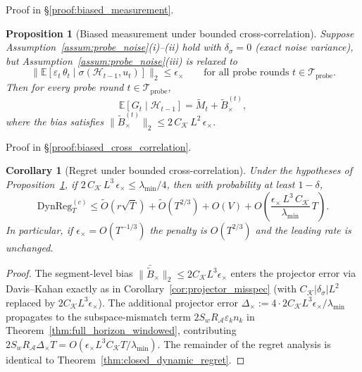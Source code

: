 \documentclass{article}
\newcommand{\E}{\mathbb{E}}
\newcommand{\cA}{\mathcal{A}}
\newcommand{\cH}{\mathcal{H}}
\newcommand{\cTprobe}{\mathcal{T}_{\mathrm{probe}}}
\newcommand{\DynReg}{\mathrm{DynReg}}
\newtheorem{corollary}{Corollary}
\newtheorem{proposition}{Proposition}
\begin{document}
Proof in \S\ref{proof:biased_measurement}.
 \begin{proposition}[Biased measurement under bounded cross-correlation]
  \label{prop:biased_cross_correlation}
  Suppose Assumption~\ref{assum:probe_noise}(i)--(ii) hold with $\delta_\sigma=0$
  (exact noise variance), but Assumption~\ref{assum:probe_noise}(iii) is relaxed to
  \[
  \bigl\|\E[\varepsilon_t\,\theta_t \mid \sigma(\cH_{t-1},u_t)]\bigr\|_2 \le \epsilon_\times
  \qquad \text{for all probe rounds } t \in \cTprobe.
  \]
  Then for every probe round $t\in\cTprobe$,
  \[
  \E[G_t \mid \cH_{t-1}] = \widetilde M_t + \widetilde B_\times^{(t)},
  \]
  where the bias satisfies $\|\widetilde B_\times^{(t)}\|_2 \le 2\,C_{\mathcal K}\,L^2\,\epsilon_\times$.
  \end{proposition}
Proof in \S\ref{proof:biased_cross_correlation}.


  \begin{corollary}[Regret under bounded cross-correlation]
  \label{cor:regret_cross_correlation}
  Under the hypotheses of Proposition~\ref{prop:biased_cross_correlation},
  if $2\,C_{\mathcal K}\,L^3\,\epsilon_\times \le \lambda_{\min}/4$, then
  with probability at least $1-\delta$,
  \[
  \DynReg_T^{(c)}
  \le \widetilde O(r\sqrt{T}) + \widetilde O(T^{2/3}) + O(V)
  + O\!\left(\frac{\epsilon_\times\,L^3\,C_{\mathcal K}}{\lambda_{\min}}\,T\right).
  \]
  In particular, if $\epsilon_\times = O(T^{-1/3})$ the penalty is
  $O(T^{2/3})$ and the leading rate is unchanged.
  \end{corollary}

  \begin{proof}
  The segment-level bias $\|\bar{\widetilde B}_\times\|_2 \le 2C_{\mathcal K}L^3\epsilon_\times$
  enters the projector error via Davis--Kahan exactly as in Corollary~\ref{cor:projector_misspec}
  (with $C_{\mathcal K}|\delta_\sigma|L^2$ replaced by $2C_{\mathcal K}L^3\epsilon_\times$).
  The additional projector error $\Delta_\times := 4\cdot 2C_{\mathcal K}L^3\epsilon_\times/\lambda_{\min}$
  propagates to the subspace-mismatch term $2S_wR_{\cA}\varepsilon_k n_k$ in
  Theorem~\ref{thm:full_horizon_windowed}, contributing $2S_wR_{\cA}\Delta_\times T
  = O(\epsilon_\times L^3 C_{\mathcal K} T/\lambda_{\min})$.
  The remainder of the regret analysis is identical to Theorem~\ref{thm:closed_dynamic_regret}.
  \end{proof}
\end{document}
